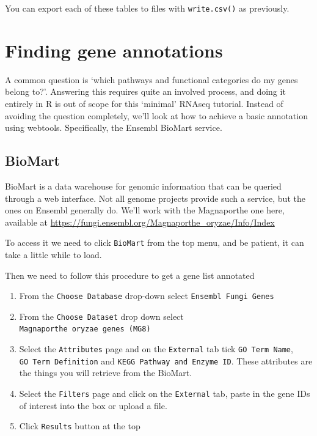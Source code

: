 \documentclass[]{book}
\providecommand{\tightlist}{%
  \setlength{\itemsep}{0pt}\setlength{\parskip}{0pt}}
\begin{document}
You can export each of these tables to files with \texttt{write.csv()} as previously.

\hypertarget{finding-gene-annotations}{%
\section{Finding gene annotations}\label{finding-gene-annotations}}

A common question is `which pathways and functional categories do my genes belong to?'. Answering this requires quite an involved process, and doing it entirely in R is out of scope for this `minimal' RNAseq tutorial. Instead of avoiding the question completely, we'll look at how to achieve a basic annotation using webtools. Specifically, the Ensembl BioMart service.

\hypertarget{biomart}{%
\subsection{BioMart}\label{biomart}}

BioMart is a data warehouse for genomic information that can be queried through a web interface. Not all genome projects provide such a service, but the ones on Ensembl generally do. We'll work with the Magnaporthe one here, available at \url{https://fungi.ensembl.org/Magnaporthe_oryzae/Info/Index}

To access it we need to click \texttt{BioMart} from the top menu, and be patient, it can take a little while to load.

Then we need to follow this procedure to get a gene list annotated

\begin{enumerate}
\def\labelenumi{\arabic{enumi}.}
\tightlist
\item
  From the \texttt{Choose\ Database} drop-down select \texttt{Ensembl\ Fungi\ Genes}
\item
  From the \texttt{Choose\ Dataset} drop down select \texttt{Magnaporthe\ oryzae\ genes\ (MG8)}
\item
  Select the \texttt{Attributes} page and on the \texttt{External} tab tick \texttt{GO\ Term\ Name}, \texttt{GO\ Term\ Definition} and \texttt{KEGG\ Pathway\ and\ Enzyme\ ID}. These attributes are the things you will retrieve from the BioMart.
\item
  Select the \texttt{Filters} page and click on the \texttt{External} tab, paste in the gene IDs of interest into the box or upload a file.
\item
  Click \texttt{Results} button at the top
\end{enumerate}
\end{document}
